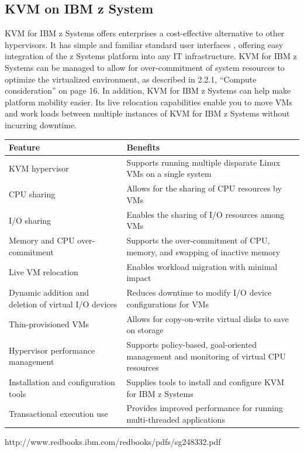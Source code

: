 \documentclass[14pt]{extreport}
\begin{document}
\subsection{KVM on IBM z System}
KVM for IBM z Systems offers enterprises a cost-effective alternative to other hypervisors. It 
has simple and familiar standard user interfaces
, offering easy integration of the z Systems 
platform into any IT infrastructure. 
KVM for IBM z Systems can be managed to allow for over-commitment of system resources 
to optimize the virtualized environment, as described in 2.2.1, “Compute consideration” on 
page 16. 
In addition, KVM for IBM z Systems can help make
 platform mobility easier. Its live relocation 
capabilities enable you to move VMs and work
loads between multiple instances of KVM for 
IBM z Systems without incurring downtime.
\begin{table}[]
\centering
\begin{tabular}{|p{5cm}|p{10cm}|}
\hline
\textbf{Feature}                                     & \textbf{Benefits}                                                                       \\ \hline
KVM hypervisor                                       & Supports running multiple disparate Linux VMs on a single system                        \\ \hline
CPU sharing                                          & Allows for the sharing of CPU resources by VMs                                          \\ \hline
I/O sharing                                          & Enables the sharing of I/O resources among VMs                                          \\ \hline
Memory and CPU over-commitment                       & Supports the over-commitment of CPU, memory, and swapping of inactive memory            \\ \hline
Live VM relocation                                   & Enables workload migration with minimal impact                                          \\ \hline
Dynamic addition and deletion of virtual I/O devices & Reduces downtime to modify I/O device configurations for VMs                            \\ \hline
Thin-provisioned VMs                                 & Allows for copy-on-write virtual disks to save on storage                               \\ \hline
Hypervisor performance management                    & Supports policy-based, goal-oriented management and monitoring of virtual CPU resources \\ \hline
Installation and configuration tools                 & Supplies tools to install and configure KVM for IBM z Systems                           \\ \hline
Transactional execution use                          & Provides improved performance for running multi-threaded applications                   \\ \hline
\end{tabular}
\end{table}
http://www.redbooks.ibm.com/redbooks/pdfs/sg248332.pdf
\end{document}
